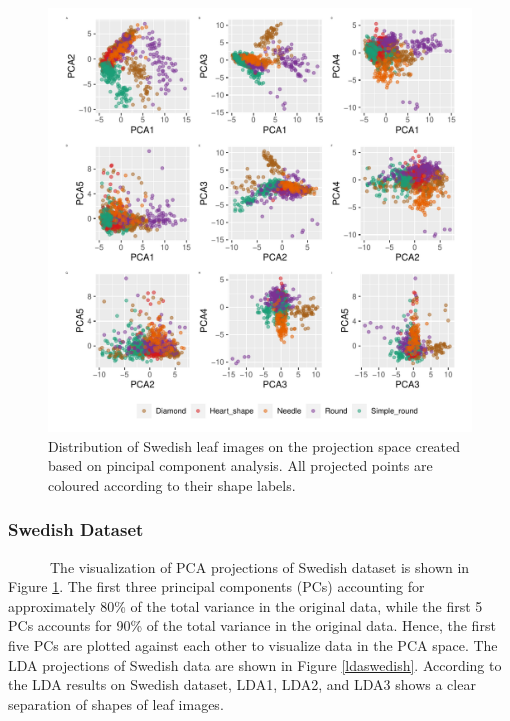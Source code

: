\documentclass{article}
\begin{document}
\begin{figure}
\centering
\includegraphics{img/pcaswedish-1.pdf}
\caption{\label{pcaswedish}Distribution of Swedish leaf images on the
projection space created based on pincipal component analysis. All
projected points are coloured according to their shape labels.}
\end{figure}

\hypertarget{swedish-dataset}{%
\subsubsection{Swedish Dataset}\label{swedish-dataset}}

~~~~~~The visualization of PCA projections of Swedish dataset is shown
in Figure \ref{pcaswedish}. The first three principal components (PCs)
accounting for approximately 80\% of the total variance in the original
data, while the first 5 PCs accounts for 90\% of the total variance in
the original data. Hence, the first five PCs are plotted against each
other to visualize data in the PCA space. The LDA projections of Swedish
data are shown in Figure \ref{ldaswedish}. According to the LDA results
on Swedish dataset, LDA1, LDA2, and LDA3 shows a clear separation of
shapes of leaf images.
\end{document}
